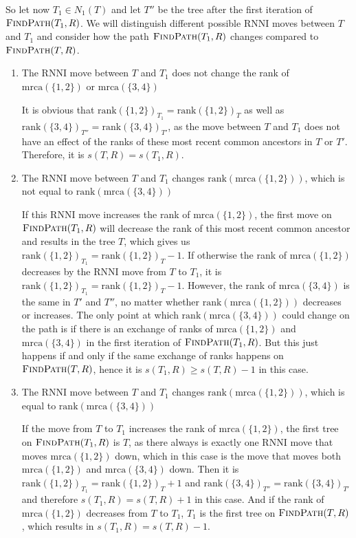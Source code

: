 \documentclass{amsart}
\newcommand{\rnni}{\mathrm{RNNI}}
\newcommand{\findpath}{\textsc{FindPath}}
\newcommand{\mrca}{\mathrm{mrca}}
\newcommand{\rank}{\mathrm{rank}}
\begin{document}
So let now $T_1 \in N_1(T)$ and let $T''$ be the tree after the first iteration of $\findpath(T_1,R)$. We will distinguish different possible $\rnni$ moves between $T$ and $T_1$ and consider how the path $\findpath(T_1,R)$ changes compared to $\findpath(T,R)$.

\begin{enumerate}

    \item The $\rnni$ move between $T$ and $T_1$ does not change the rank of $\mrca(\{1,2\})$ or $\mrca(\{3,4\})$

    It is obvious that $\rank(\{1,2\})_{T_1} = \rank(\{1,2\})_{T}$ as well as $\rank(\{3,4\})_{T''} = \rank(\{3,4\})_{T'}$, as the move between $T$ and $T_1$ does not have an effect of the ranks of these most recent common ancestors in $T$ or $T'$.
    Therefore, it is $s(T, R) = s(T_1,R)$.

    \item The $\rnni$ move between $T$ and $T_1$ changes $\rank(\mrca(\{1,2\}))$, which is not equal to $\rank(\mrca(\{3,4\}))$

    If this $\rnni$ move increases the rank of $\mrca(\{1,2\})$, the first move on $\findpath(T_1,R)$ will decrease the rank of this most recent common ancestor and results in the tree $T$, which gives us $\rank(\{1,2\})_{T_1} = \rank(\{1,2\})_{T} - 1$.
    If otherwise the rank of $\mrca(\{1,2\})$ decreases by the $\rnni$ move from $T$ to $T_1$, it is $\rank(\{1,2\})_{T_1} = \rank(\{1,2\})_T - 1$.
    However, the rank of $\mrca(\{3,4\})$ is the same in $T'$ and $T''$, no matter whether $\rank(\mrca(\{1,2\}))$ decreases or increases.
    The only point at which $\rank(\mrca(\{3,4\}))$ could change on the path is if there is an exchange of ranks of $\mrca(\{1,2\})$ and $\mrca(\{3,4\})$ in the first iteration of $\findpath(T_1,R)$.
    But this just happens if and only if the same exchange of ranks happens on $\findpath(T,R)$, hence it is $s(T_1,R) \geq s(T,R) - 1$ in this case.

    \item The $\rnni$ move between $T$ and $T_1$ changes $\rank(\mrca(\{1,2\}))$, which is equal to $\rank(\mrca(\{3,4\}))$

    If the move from $T$ to $T_1$ increases the rank of $\mrca(\{1,2\})$, the first tree on $\findpath(T_1,R)$ is $T$, as there always is exactly one $\rnni$ move that moves $\mrca(\{1,2\})$ down, which in this case is the move that moves both $\mrca(\{1,2\})$ and $\mrca(\{3,4\})$ down.
    Then it is $\rank(\{1,2\})_{T_1} = \rank(\{1,2\})_{T} + 1$ and $\rank(\{3,4\})_{T''} = \rank(\{3,4\})_{T'}$ and therefore $s(T_1,R) = s(T,R) + 1$ in this case.
    And if the rank of $\mrca(\{1,2\})$ decreases from $T$ to $T_1$, $T_1$ is the first tree on $\findpath(T,R)$, which results in $s(T_1,R) = s(T,R) - 1$.


\end{enumerate}
\end{document}
